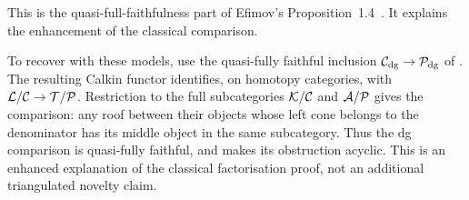 This is the quasi-full-faithfulness part of Efimov's Proposition~1.4~\cite{Efimov17}.  It explains the enhancement of the classical comparison.


To recover  with these models, use the quasi-fully faithful inclusion \(\mathcal C_{\mathrm{dg}}\to\mathcal P_{\mathrm{dg}}\) of . The resulting Calkin functor identifies, on homotopy categories, with \(\mathcal L/\mathcal C\to\mathcal T/\mathcal P\). Restriction to the full subcategories \(\mathcal K/\mathcal C\) and \(\mathcal A/\mathcal P\) gives the comparison: any roof between their objects whose left cone belongs to the denominator has its middle object in the same subcategory. Thus the dg comparison is quasi-fully faithful, and  makes its obstruction acyclic. This is an enhanced explanation of the classical factorisation proof, not an additional triangulated novelty claim.
